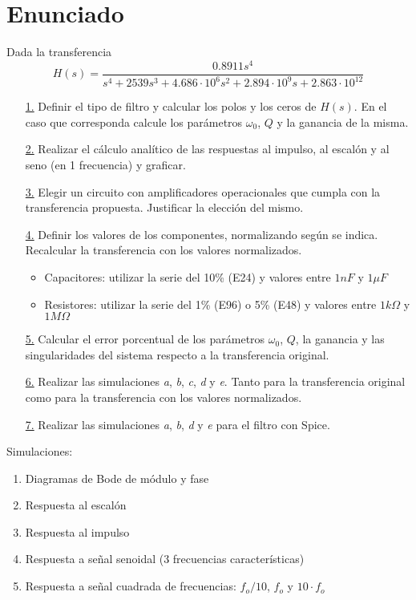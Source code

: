 \documentclass{estilo}
\begin{document}
\maketitle

\section*{Enunciado}
Dada la transferencia
$$
H(s) = \frac{0.8911 s^4}{s^4 + 2539 s^3 + 4.686 \cdot 10^6 s^2 + 2.894 \cdot 10^9 s + 2.863 \cdot 10^{12}}
$$

\begin{enumerate}
    \item[\hyperlink{ej1}{1.}] Definir el tipo de filtro y calcular los polos y los ceros de $H(s)$. En el caso que corresponda calcule los parámetros $\omega_0$, $Q$ y la ganancia de la misma.
    \item[\hyperlink{ej2}{2.}] Realizar el cálculo analítico de las respuestas al impulso, al escalón y al seno (en 1 frecuencia) y graficar.
    \item[\hyperlink{ej3}{3.}] Elegir un circuito con amplificadores operacionales que cumpla con la transferencia propuesta. Justificar la elección del mismo.
    \item[\hyperlink{ej4}{4.}] Definir los valores de los componentes, normalizando según se indica. Recalcular la transferencia con los valores normalizados.
        \begin{itemize}
            \item Capacitores: utilizar la serie del 10\% (E24) y valores entre $1 n F$ y $1 \mu F$
            \item Resistores: utilizar la serie del 1\% (E96) o 5\% (E48) y valores entre $1k\Omega$ y $1M\Omega$
        \end{itemize}
    \item[\hyperlink{ej5}{5.}] Calcular el error porcentual de los parámetros $\omega_0$, $Q$, la ganancia y las singularidades del sistema respecto a la transferencia original.
    \item[\hyperlink{ej6}{6.}] Realizar las simulaciones \textit{a}, \textit{b}, \textit{c}, \textit{d} y \textit{e}. Tanto para la transferencia original como para la transferencia con los valores normalizados.
    \item[\hyperlink{ej7}{7.}] Realizar las simulaciones \textit{a}, \textit{b}, \textit{d} y \textit{e} para el filtro con Spice.
\end{enumerate}
Simulaciones:
    \begin{enumerate}[label=\alph*)]
        \item Diagramas de Bode de módulo y fase
        \item Respuesta al escalón
        \item Respuesta al impulso
        \item Respuesta a señal senoidal (3 frecuencias características)
        \item Respuesta a señal cuadrada de frecuencias: $f_o/10$,  $f_o$ y $10\cdot f_o$
    \end{enumerate}
\end{document}
